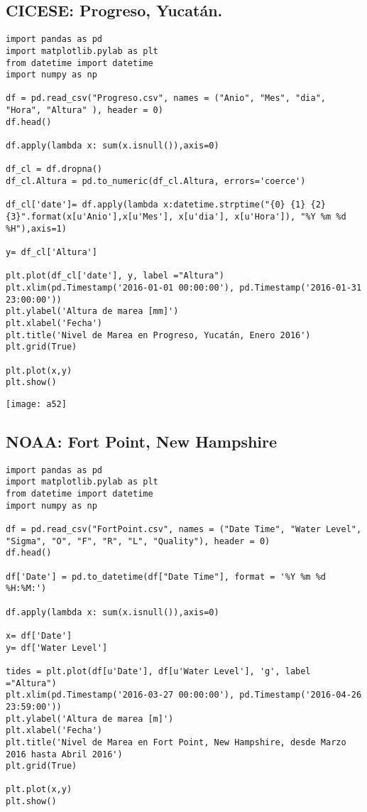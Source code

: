 \documentclass[12pt,a4paper]{article}
\begin{document}
\subsection{CICESE: Progreso, Yucatán.}

\begin{verbatim}
import pandas as pd
import matplotlib.pylab as plt
from datetime import datetime
import numpy as np

df = pd.read_csv("Progreso.csv", names = ("Anio", "Mes", "dia", "Hora", "Altura" ), header = 0)
df.head()

df.apply(lambda x: sum(x.isnull()),axis=0)

df_cl = df.dropna()
df_cl.Altura = pd.to_numeric(df_cl.Altura, errors='coerce')

df_cl['date']= df.apply(lambda x:datetime.strptime("{0} {1} {2} {3}".format(x[u'Anio'],x[u'Mes'], x[u'dia'], x[u'Hora']), "%Y %m %d %H"),axis=1)

y= df_cl['Altura']

plt.plot(df_cl['date'], y, label ="Altura")
plt.xlim(pd.Timestamp('2016-01-01 00:00:00'), pd.Timestamp('2016-01-31 23:00:00')) 
plt.ylabel('Altura de marea [mm]')
plt.xlabel('Fecha')
plt.title('Nivel de Marea en Progreso, Yucatán, Enero 2016')
plt.grid(True) 

plt.plot(x,y)
plt.show()
\end{verbatim}

\begin{center}
\texttt{[image: a52]}
\end{center}

\subsection{NOAA: Fort Point, New Hampshire}

\begin{verbatim}
import pandas as pd
import matplotlib.pylab as plt
from datetime import datetime
import numpy as np

df = pd.read_csv("FortPoint.csv", names = ("Date Time", "Water Level", "Sigma", "O", "F", "R", "L", "Quality"), header = 0)
df.head()

df['Date'] = pd.to_datetime(df["Date Time"], format = '%Y %m %d %H:%M:')

df.apply(lambda x: sum(x.isnull()),axis=0)

x= df['Date']
y= df['Water Level']

tides = plt.plot(df[u'Date'], df[u'Water Level'], 'g', label ="Altura")
plt.xlim(pd.Timestamp('2016-03-27 00:00:00'), pd.Timestamp('2016-04-26 23:59:00'))
plt.ylabel('Altura de marea [m]')
plt.xlabel('Fecha')
plt.title('Nivel de Marea en Fort Point, New Hampshire, desde Marzo 2016 hasta Abril 2016')
plt.grid(True)

plt.plot(x,y)
plt.show()
\end{verbatim}
\end{document}
